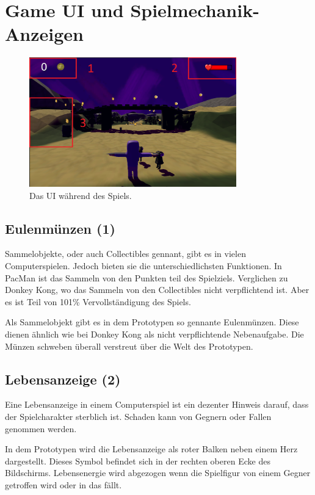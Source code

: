 \section{Game UI und Spielmechanik-Anzeigen}

\begin{figure}[H]
    \centering
    \includegraphics[width=0.8\textwidth]{chapters/03/images/GameUI.png}
    \caption{Das UI während des Spiels.}
    \label{htl03}
\end{figure}

\subsection{Eulenmünzen (1)}
Sammelobjekte, oder auch Collectibles gennant, gibt es in vielen Computerspielen. Jedoch bieten sie die unterschiedlichsten Funktionen. In PacMan ist das Sammeln von den Punkten teil des Spielziels. Verglichen zu Donkey Kong, wo das Sammeln von den Collectibles nicht verpflichtend ist. Aber es ist Teil von 101\% Vervollständigung des Spiels.

Als Sammelobjekt gibt es in dem Prototypen so gennante \glqq Eulenmünzen\grqq. Diese dienen ähnlich wie bei Donkey Kong als nicht verpflichtende Nebenaufgabe. Die Münzen schweben überall verstreut über die Welt des Prototypen. 

\subsection{Lebensanzeige (2)}

Eine Lebensanzeige in einem Computerspiel ist ein dezenter Hinweis darauf, dass der Spielcharakter sterblich ist. Schaden kann von Gegnern oder Fallen genommen werden.

In dem Prototypen wird die Lebensanzeige als roter Balken neben einem Herz dargestellt. Dieses Symbol befindet sich in der rechten oberen Ecke des Bildschirms. Lebensenergie wird abgezogen wenn die Spielfigur von einem Gegner getroffen wird oder in das  fällt.

